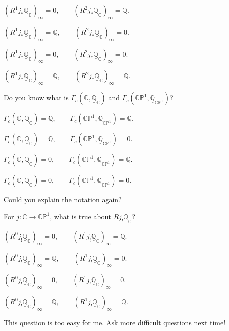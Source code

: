 \documentclass[UTF8]{amsart}
\numberwithin{equation}{section}
\theoremstyle{plain}
\numberwithin{equation}{section}
\theoremstyle{remark}
\begin{document}
$(R^1j_* \underline{\mathbb{Q}}_{\mathbb{C}})_{\infty} =0, \qquad
(R^2j_* \underline{\mathbb{Q}}_{\mathbb{C}})_{\infty} =\mathbb{Q}.
$

$(R^1j_* \underline{\mathbb{Q}}_{\mathbb{C}})_{\infty} =\mathbb{Q}, \qquad
(R^2j_* \underline{\mathbb{Q}}_{\mathbb{C}})_{\infty} =0.
$

$(R^1j_* \underline{\mathbb{Q}}_{\mathbb{C}})_{\infty} =0, \qquad
(R^2j_* \underline{\mathbb{Q}}_{\mathbb{C}})_{\infty} =0.
$

$(R^1j_* \underline{\mathbb{Q}}_{\mathbb{C}})_{\infty} =\mathbb{Q}, \qquad
(R^2j_* \underline{\mathbb{Q}}_{\mathbb{C}})_{\infty} =\mathbb{Q}.
$

Do you know what is $\Gamma_c(\mathbb{C}, \underline{\mathbb{Q}}_{\mathbb{C}})$ and $\Gamma_c(\mathbb{CP}^1, \underline{\mathbb{Q}}_{\mathbb{CP}^1})$?

$\Gamma_c(\mathbb{C}, \underline{\mathbb{Q}}_{\mathbb{C}})=\mathbb{Q}, \qquad \Gamma_c(\mathbb{CP}^1, \underline{\mathbb{Q}}_{\mathbb{CP}^1})=\mathbb{Q}.$

$\Gamma_c(\mathbb{C}, \underline{\mathbb{Q}}_{\mathbb{C}})=\mathbb{Q}, \qquad \Gamma_c(\mathbb{CP}^1, \underline{\mathbb{Q}}_{\mathbb{CP}^1})=0.$

$\Gamma_c(\mathbb{C}, \underline{\mathbb{Q}}_{\mathbb{C}})=0, \qquad \Gamma_c(\mathbb{CP}^1, \underline{\mathbb{Q}}_{\mathbb{CP}^1})=\mathbb{Q}.$

$\Gamma_c(\mathbb{C}, \underline{\mathbb{Q}}_{\mathbb{C}})=0, \qquad \Gamma_c(\mathbb{CP}^1, \underline{\mathbb{Q}}_{\mathbb{CP}^1})=0.$

Could you explain the notation again?


For $j: \mathbb{C} \longrightarrow \mathbb{CP}^1$, what is true about $Rj_! \underline{\mathbb{Q}}_{\mathbb{C}}$?

$(R^0j_! \underline{\mathbb{Q}}_{\mathbb{C}})_{\infty} =0, \qquad
(R^1j_! \underline{\mathbb{Q}}_{\mathbb{C}})_{\infty} =\mathbb{Q}.
$

$(R^0j_! \underline{\mathbb{Q}}_{\mathbb{C}})_{\infty} =\mathbb{Q}, \qquad
(R^1j_! \underline{\mathbb{Q}}_{\mathbb{C}})_{\infty} =0.
$

$(R^0j_! \underline{\mathbb{Q}}_{\mathbb{C}})_{\infty} =0, \qquad
(R^1j_! \underline{\mathbb{Q}}_{\mathbb{C}})_{\infty} =0.
$

$(R^0j_! \underline{\mathbb{Q}}_{\mathbb{C}})_{\infty} =\mathbb{Q}, \qquad
(R^1j_! \underline{\mathbb{Q}}_{\mathbb{C}})_{\infty} =\mathbb{Q}.
$

This question is too easy for me. Ask more difficult questions next time!
\end{document}
